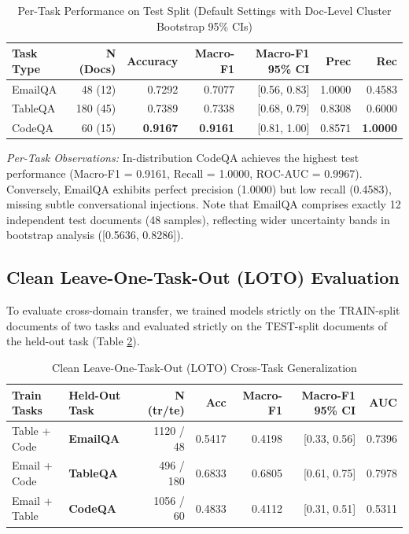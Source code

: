 \documentclass[10pt,conference]{IEEEtran}
\begin{document}
\begin{table}[h]
\centering
\caption{Per-Task Performance on Test Split (Default Settings with Doc-Level Cluster Bootstrap 95\% CIs)}
\label{tab:per_task}
\begin{tabular}{lrrrrrr}
\toprule
\textbf{Task Type} & \textbf{N (Docs)} & \textbf{Accuracy} & \textbf{Macro-F1} & \textbf{Macro-F1 95\% CI} & \textbf{Prec} & \textbf{Rec} \\
\midrule
EmailQA & 48 (12)  & 0.7292 & 0.7077 & [0.56, 0.83] & 1.0000 & 0.4583 \\
TableQA & 180 (45) & 0.7389 & 0.7338 & [0.68, 0.79] & 0.8308 & 0.6000 \\
CodeQA  & 60 (15)  & \textbf{0.9167} & \textbf{0.9161} & [0.81, 1.00] & 0.8571 & \textbf{1.0000} \\
\bottomrule
\end{tabular}
\end{table}

\noindent\textit{Per-Task Observations:}
In-distribution CodeQA achieves the highest test performance (Macro-F1 = 0.9161, Recall = 1.0000, ROC-AUC = 0.9967). Conversely, EmailQA exhibits perfect precision (1.0000) but low recall (0.4583), missing subtle conversational injections. Note that EmailQA comprises exactly 12 independent test documents (48 samples), reflecting wider uncertainty bands in bootstrap analysis ([0.5636, 0.8286]).

\subsection{Clean Leave-One-Task-Out (LOTO) Evaluation}
To evaluate cross-domain transfer, we trained models strictly on the TRAIN-split documents of two tasks and evaluated strictly on the TEST-split documents of the held-out task (Table \ref{tab:loto}).

\begin{table}[h]
\centering
\caption{Clean Leave-One-Task-Out (LOTO) Cross-Task Generalization}
\label{tab:loto}
\begin{tabular}{llrrrrr}
\toprule
\textbf{Train Tasks} & \textbf{Held-Out Task} & \textbf{N (tr/te)} & \textbf{Acc} & \textbf{Macro-F1} & \textbf{Macro-F1 95\% CI} & \textbf{AUC} \\
\midrule
Table + Code & \textbf{EmailQA} & 1120 / 48  & 0.5417 & 0.4198 & [0.33, 0.56] & 0.7396 \\
Email + Code & \textbf{TableQA} & 496 / 180  & 0.6833 & 0.6805 & [0.61, 0.75] & 0.7978 \\
Email + Table& \textbf{CodeQA}  & 1056 / 60  & 0.4833 & 0.4112 & [0.31, 0.51] & 0.5311 \\
\bottomrule
\end{tabular}
\end{table}
\end{document}
